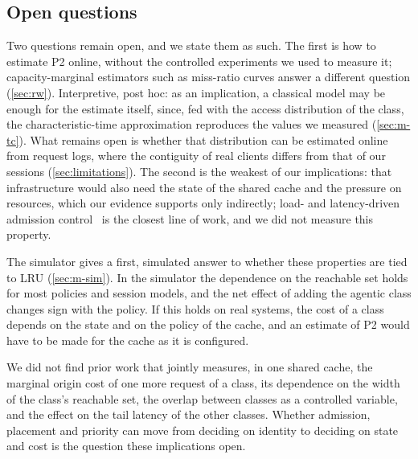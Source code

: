 \subsection{Open questions}\label{sec:open}
Two questions remain open, and we state them as such.
The first is how to estimate P2 online, without the controlled experiments we used to
measure it; capacity-marginal estimators such as miss-ratio curves answer a different
question (\cref{sec:rw}).
Interpretive, post hoc: as an implication, a classical model may be enough for the estimate
itself, since, fed with the access distribution of the class, the characteristic-time
approximation reproduces the values we measured (\cref{sec:m-tc}).
What remains open is whether that distribution can be estimated online from request logs,
where the contiguity of real clients differs from that of our sessions
(\cref{sec:limitations}).
The second is the weakest of our implications: that infrastructure would also need the
state of the shared cache and the pressure on resources, which our evidence supports only
indirectly; load- and latency-driven admission
control~\cite{cho2020breakwater,zhou2018dagor,cho2023protego,park2024topfull} is the
closest line of work, and we did not measure this property.

The simulator gives a first, simulated answer to whether these properties are tied to LRU
(\cref{sec:m-sim}).
In the simulator the dependence on the reachable set holds for most policies and session
models, and the net effect of adding the agentic class changes sign with the
policy.
If this holds on real systems, the cost of a class depends on the state and on the policy of
the cache, and an estimate of P2 would have to be made for the cache as it is
configured.

We did not find prior work that jointly measures, in one shared cache, the marginal origin
cost of one more request of a class, its dependence on the width of the class's reachable
set, the overlap between classes as a controlled variable, and the effect on the tail
latency of the other classes.
Whether admission, placement and priority can move from deciding on identity to deciding
on state and cost is the question these implications open.
